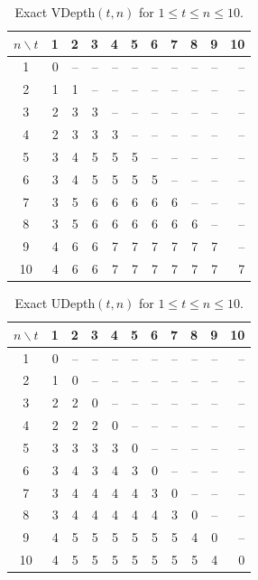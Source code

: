 \begin{table}[htbp]
\centering
\caption{Exact VDepth$(t,n)$ for $1\le t\le n\le 10$.}
\begin{tabular}{c|rrrrrrrrrr}
$n\backslash t$ & 1 & 2 & 3 & 4 & 5 & 6 & 7 & 8 & 9 & 10 \\
\hline
1 & 0 & -- & -- & -- & -- & -- & -- & -- & -- & -- \\
2 & 1 & 1 & -- & -- & -- & -- & -- & -- & -- & -- \\
3 & 2 & 3 & 3 & -- & -- & -- & -- & -- & -- & -- \\
4 & 2 & 3 & 3 & 3 & -- & -- & -- & -- & -- & -- \\
5 & 3 & 4 & 5 & 5 & 5 & -- & -- & -- & -- & -- \\
6 & 3 & 4 & 5 & 5 & 5 & 5 & -- & -- & -- & -- \\
7 & 3 & 5 & 6 & 6 & 6 & 6 & 6 & -- & -- & -- \\
8 & 3 & 5 & 6 & 6 & 6 & 6 & 6 & 6 & -- & -- \\
9 & 4 & 6 & 6 & 7 & 7 & 7 & 7 & 7 & 7 & -- \\
10 & 4 & 6 & 6 & 7 & 7 & 7 & 7 & 7 & 7 & 7 \\
\end{tabular}
\end{table}

\begin{table}[htbp]
\centering
\caption{Exact UDepth$(t,n)$ for $1\le t\le n\le 10$.}
\begin{tabular}{c|rrrrrrrrrr}
$n\backslash t$ & 1 & 2 & 3 & 4 & 5 & 6 & 7 & 8 & 9 & 10 \\
\hline
1 & 0 & -- & -- & -- & -- & -- & -- & -- & -- & -- \\
2 & 1 & 0 & -- & -- & -- & -- & -- & -- & -- & -- \\
3 & 2 & 2 & 0 & -- & -- & -- & -- & -- & -- & -- \\
4 & 2 & 2 & 2 & 0 & -- & -- & -- & -- & -- & -- \\
5 & 3 & 3 & 3 & 3 & 0 & -- & -- & -- & -- & -- \\
6 & 3 & 4 & 3 & 4 & 3 & 0 & -- & -- & -- & -- \\
7 & 3 & 4 & 4 & 4 & 4 & 3 & 0 & -- & -- & -- \\
8 & 3 & 4 & 4 & 4 & 4 & 4 & 3 & 0 & -- & -- \\
9 & 4 & 5 & 5 & 5 & 5 & 5 & 5 & 4 & 0 & -- \\
10 & 4 & 5 & 5 & 5 & 5 & 5 & 5 & 5 & 4 & 0 \\
\end{tabular}
\end{table}
